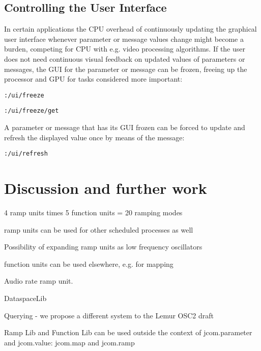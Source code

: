 \documentclass{article}
\begin{document}
\subsection{Controlling the User Interface} %
\label{sub:controlling_the_user_interface}

In certain applications the CPU overhead of continuously updating the graphical user interface whenever parameter or message values change might become a burden, competing for CPU with e.g. video processing algorithms. If the user does not need continuous visual feedback on updated values of parameters or messages, the GUI for the parameter or message can be frozen, freeing up the processor and GPU for tasks considered more important:

\texttt{:/ui/freeze}

\texttt{:/ui/freeze/get}

A parameter or message that has its GUI frozen can be forced to update and refresh the displayed value once by means of the message:

\texttt{:/ui/refresh}





\section{Discussion and further work} %
\label{sec:discussion_and_further_work}

4 ramp units times 5 function units = 20 ramping modes

ramp units can be used for other scheduled processes as well

Possibility of expanding ramp units as low frequency oscillators

function units can be used elsewhere, e.g. for mapping

Audio rate ramp unit.

DataspaceLib

Querying - we propose a different system to the Lemur OSC2 draft

Ramp Lib and Function Lib can be used outside the context of jcom.parameter and jcom.value: jcom.map and jcom.ramp




\cite{Momeni:2003}
\end{document}
